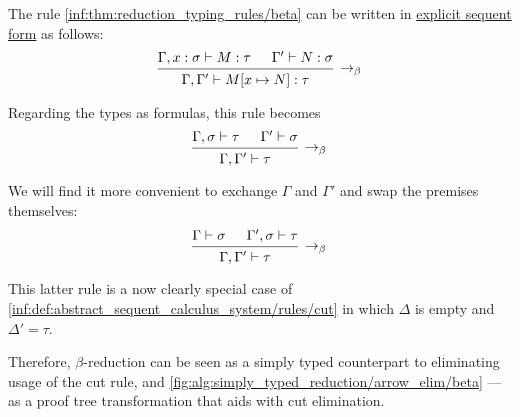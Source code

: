 \begin{remark}\label{rem:beta_reduction_and_cut_elimination}
  The rule \ref{inf:thm:reduction_typing_rules/beta} can be written in \hyperref[rem:natural_deduction_explicit_sequents]{explicit sequent form} as follows:
  \begin{equation*}
    \begin{prooftree}
      \hypo{ \Gamma, x: \sigma \vdash M: \tau }
      \hypo{ \Gamma' \vdash N: \sigma }
      \infer2[\ensuremath{ \rightarrow_\beta }]{ \Gamma, \Gamma' \vdash M[x \mapsto N]: \tau }
    \end{prooftree}
  \end{equation*}

  Regarding the types as formulas, this rule becomes
  \begin{equation*}
    \begin{prooftree}
      \hypo{ \Gamma, \sigma \vdash \tau }
      \hypo{ \Gamma' \vdash \sigma }
      \infer2[\ensuremath{ \rightarrow_\beta }]{ \Gamma, \Gamma' \vdash \tau }
    \end{prooftree}
  \end{equation*}

  We will find it more convenient to exchange \( \Gamma \) and \( \Gamma' \) and swap the premises themselves:
  \begin{equation*}
    \begin{prooftree}
      \hypo{ \Gamma \vdash \sigma }
      \hypo{ \Gamma', \sigma \vdash \tau }
      \infer2[\ensuremath{ \rightarrow_\beta }]{ \Gamma, \Gamma' \vdash \tau }
    \end{prooftree}
  \end{equation*}

  This latter rule is a now clearly special case of \ref{inf:def:abstract_sequent_calculus_system/rules/cut} in which \( \Delta \) is empty and \( \Delta' = \tau \).

  Therefore, \( \beta \)-reduction can be seen as a simply typed counterpart to eliminating usage of the cut rule, and \cref{fig:alg:simply_typed_reduction/arrow_elim/beta} --- as a proof tree transformation that aids with cut elimination.
\end{remark}

